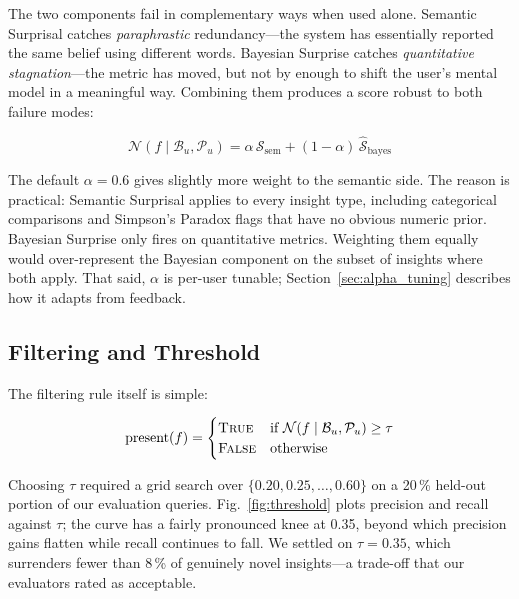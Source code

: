 \documentclass[conference]{IEEEtran}
\begin{document}
The two components fail in complementary ways when used alone.
Semantic Surprisal catches \emph{paraphrastic} redundancy---the
system has essentially reported the same belief using different words.
Bayesian Surprise catches \emph{quantitative stagnation}---the
metric has moved, but not by enough to shift the user's mental model
in a meaningful way. Combining them produces a score robust to both
failure modes:

\begin{equation}
  \mathcal{N}(f \mid \mathcal{B}_u, \mathcal{P}_u)
    = \alpha\,\mathcal{S}_{\text{sem}}
      + (1 - \alpha)\,\hat{\mathcal{S}}_{\text{bayes}}
  \label{eq:hybrid}
\end{equation}

The default $\alpha = 0.6$ gives slightly more weight to the semantic
side. The reason is practical: Semantic Surprisal applies to every
insight type, including categorical comparisons and Simpson's Paradox
flags that have no obvious numeric prior. Bayesian Surprise only fires
on quantitative metrics. Weighting them equally would over-represent
the Bayesian component on the subset of insights where both apply.
That said, $\alpha$ is per-user tunable; Section~\ref{sec:alpha_tuning}
describes how it adapts from feedback.

\subsection{Filtering and Threshold}

The filtering rule itself is simple:

\begin{equation}
  \text{present}(f) =
  \begin{cases}
    \textsc{True}  & \text{if } \mathcal{N}(f \mid \mathcal{B}_u, \mathcal{P}_u) \geq \tau \\
    \textsc{False} & \text{otherwise}
  \end{cases}
  \label{eq:filter}
\end{equation}

Choosing $\tau$ required a grid search over $\{0.20, 0.25, \ldots,
0.60\}$ on a 20\,\% held-out portion of our evaluation queries.
Fig.~\ref{fig:threshold} plots precision and recall against $\tau$;
the curve has a fairly pronounced knee at 0.35, beyond which
precision gains flatten while recall continues to fall. We settled
on $\tau = 0.35$, which surrenders fewer than 8\,\% of genuinely
novel insights---a trade-off that our evaluators rated as acceptable.
\end{document}
